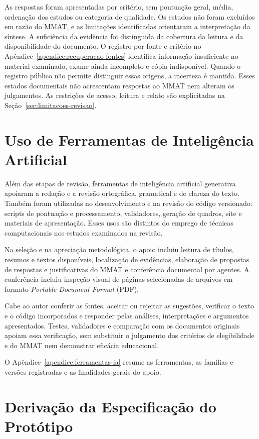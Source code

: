 As respostas foram apresentadas por critério, sem pontuação geral, média, ordenação dos estudos ou categoria de qualidade. Os estudos não foram excluídos em razão do MMAT, e as limitações identificadas orientaram a interpretação da síntese. A suficiência da evidência foi distinguida da cobertura da leitura e da disponibilidade do documento. O registro por fonte e critério no Apêndice~\ref{apendice:recuperacao-fontes} identifica informação insuficiente no material examinado, exame ainda incompleto e cópia indisponível. Quando o registro público não permite distinguir essas origens, a incerteza é mantida. Esses estados documentais não acrescentam respostas ao MMAT nem alteram os julgamentos. As restrições de acesso, leitura e relato são explicitadas na Seção~\ref{sec:limitacoes-revisao}.

\section{Uso de Ferramentas de Inteligência Artificial}
\label{sec:uso-ferramentas-ia}

Além das etapas de revisão, ferramentas de inteligência artificial generativa apoiaram a redação e a revisão ortográfica, gramatical e de clareza do texto. Também foram utilizadas no desenvolvimento e na revisão do código versionado: scripts de pontuação e processamento, validadores, geração de quadros, site e materiais de apresentação. Esses usos são distintos do emprego de técnicas computacionais nos estudos examinados na revisão.

Na seleção e na apreciação metodológica, o apoio incluiu leitura de títulos, resumos e textos disponíveis, localização de evidências, elaboração de propostas de respostas e justificativas do MMAT e conferência documental por agentes. A conferência incluiu inspeção visual de páginas selecionadas de arquivos em formato \textit{Portable Document Format} (PDF).

Cabe ao autor conferir as fontes, aceitar ou rejeitar as sugestões, verificar o texto e o código incorporados e responder pelas análises, interpretações e argumentos apresentados. Testes, validadores e comparação com os documentos originais apoiam essa verificação, sem substituir o julgamento dos critérios de elegibilidade e do MMAT nem demonstrar eficácia educacional.

O Apêndice~\ref{apendice:ferramentas-ia} resume as ferramentas, as famílias e versões registradas e as finalidades gerais do apoio.

\section{Derivação da Especificação do Protótipo}


